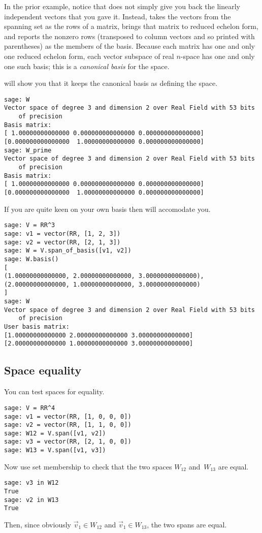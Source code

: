 In the prior example, notice that \Sage{} does not simply
give you back the linearly independent
vectors that you gave it.
Instead, \Sage{} takes the vectors from the spanning set 
as the rows of a matrix,
brings that matrix to reduced echelon form, and reports the nonzero 
rows (transposed to column vectors and so printed with parentheses) 
as the members of the basis.
Because each matrix has one and only one reduced echelon form, each 
vector subspace of real $n$-space has one and only one such
basis;
this is a \textit{canonical basis} for the space.

\Sage{} will show you that it keeps the canonical basis as defining the
space. 
\begin{lstlisting}
sage: W
Vector space of degree 3 and dimension 2 over Real Field with 53 bits 
    of precision
Basis matrix:
[ 1.00000000000000 0.000000000000000 0.000000000000000]
[0.000000000000000  1.00000000000000 0.000000000000000]
sage: W_prime
Vector space of degree 3 and dimension 2 over Real Field with 53 bits 
    of precision
Basis matrix:
[ 1.00000000000000 0.000000000000000 0.000000000000000]
[0.000000000000000  1.00000000000000 0.000000000000000]  
\end{lstlisting}

If you are quite keen on your own basis then \Sage{} will
accomodate you.
\begin{lstlisting}
sage: V = RR^3
sage: v1 = vector(RR, [1, 2, 3])
sage: v2 = vector(RR, [2, 1, 3])
sage: W = V.span_of_basis([v1, v2])
sage: W.basis()
[
(1.00000000000000, 2.00000000000000, 3.00000000000000),
(2.00000000000000, 1.00000000000000, 3.00000000000000)
]
sage: W
Vector space of degree 3 and dimension 2 over Real Field with 53 bits 
    of precision
User basis matrix:
[1.00000000000000 2.00000000000000 3.00000000000000]
[2.00000000000000 1.00000000000000 3.00000000000000]
\end{lstlisting}




\subsection{Space equality}

You can test spaces for equality.
\begin{lstlisting}
sage: V = RR^4
sage: v1 = vector(RR, [1, 0, 0, 0])
sage: v2 = vector(RR, [1, 1, 0, 0])
sage: W12 = V.span([v1, v2])
sage: v3 = vector(RR, [2, 1, 0, 0])
sage: W13 = V.span([v1, v3])  
\end{lstlisting}
Now use set membership to check that the two spaces $W_{12}$ and~$W_{13}$
are equal.
\begin{lstlisting}
sage: v3 in W12
True
sage: v2 in W13
True  
\end{lstlisting}
Then, since obviously $\vec{v}_1\in W_{12}$ and $\vec{v}_1\in W_{13}$, the two
spans are equal.

